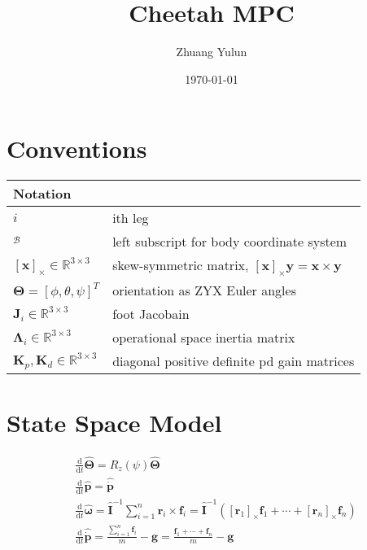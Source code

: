 \documentclass{article}
\title{Cheetah MPC}
\author{Zhuang Yulun}
\date{\today}
\begin{document}
\maketitle

\section{Conventions}


\begin{tabular}{l l}
    \hline
    Notation & \\
    \hline
    $ i$ & ith leg\\
    $_\mathcal B$ &left subscript for body coordinate system\\
    $[\mathbf x]_\times \in \mathbb R^{3\times 3}$ & skew-symmetric matrix, $[\mathbf x]_\times \mathbf y = \mathbf x \times \mathbf y$\\
    $\mathbf \Theta = [\phi, \theta, \psi]^T$ & orientation as ZYX Euler angles\\
    $\mathbf J_i\in \mathbb R^{3\times 3}$ & foot Jacobain\\
    $\mathbf\Lambda_i\in \mathbb R^{3\times 3}$ &operational space inertia matrix\\
    $\mathbf K_p, \mathbf K_d\in \mathbb R^{3\times 3}$ &diagonal positive definite pd gain matrices\\
    \hline

\end{tabular}

\section{State Space Model}
$$
\begin{aligned}
    &\frac{\mathrm d}{\mathrm d t} \hat{\mathbf\Theta}=R_{z}(\psi) \hat{\mathbf\Theta} \\
    &\frac{\mathrm d}{\mathrm d t} \hat{\mathbf p}=\hat{\dot{\mathbf p}} \\
    &\frac{\mathrm d}{\mathrm d t} \hat{\mathbf \omega}=\hat{\mathbf I}^{-1} \sum_{i=1}^{n} \mathbf r_{i} \times \mathbf f_{i}=\hat{\mathbf I}^{-1}\left(\left[\mathbf r_{1}\right]_{\times} \mathbf f_{1}+\cdots+\left[\mathbf r_{n}\right]_{\times} \mathbf f_{n}\right) \\
    &\frac{\mathrm d}{\mathrm d t} \hat{\dot{\mathbf p}}=\frac{\sum_{i=1}^{n} \mathbf f_{i}}{m}-\mathbf g=\frac{\mathbf f_{1}+\cdots+\mathbf f_{n}}{m}-\mathbf g
\end{aligned}
$$
\end{document}
